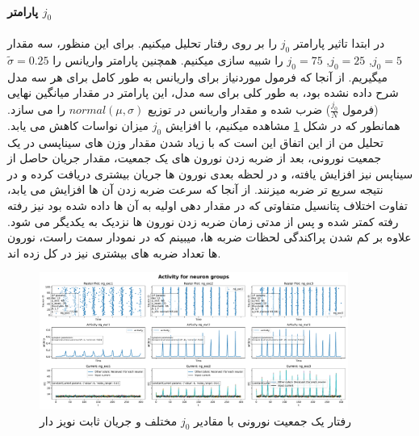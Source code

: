             \paragraph{پارامتر $j_0$}
                در ابتدا تاثیر پارامتر 
                $j_0$
                را بر روی رفتار تحلیل میکنیم. برای این منظور، سه مقدار 
                $j_0=5$,
                $j_0=25$,
                $j_0=75$
                را شبیه سازی میکنیم. همچنین پارامتر واریانس را 
                $\tilde{\sigma}=0.25$ 
                میگیریم. از آنجا که فرمول موردنیاز برای واریانس به طور کامل برای هر سه مدل شرح داده نشده بود، به طور کلی برای سه مدل، این پارامتر در مقدار میانگین نهایی
                (فرمول $\frac{j_0}{N}$) 
                ضرب شده و مقدار واریانس در توزیع 
                $normal(\mu,\sigma)$ 
                را می سازد.
                همانطور که در شکل 
                \ref{fig:part2-one-ng-full-synapse-diff-j}
                مشاهده میکنیم، با افزایش 
                $j_0$ 
                میزان نواسات کاهش می یابد. تحلیل من از این اتفاق این است که با زیاد شدن مقدار وزن های سیناپسی در یک جمعیت نورونی، بعد از ضربه زدن نورون های یک جمعیت، مقدار جریان حاصل از سیناپس نیز افزایش یافته، و در لحظه بعدی نورون ها جریان بیشتری دریافت کرده و در نتیجه سریع تر ضربه میزنند. از آنجا که سرعت ضربه زدن آن ها افزایش می یابد، تفاوت اختلاف پتانسیل متفاوتی که در مقدار دهی اولیه به آن ها داده شده بود نیز رفته رفته کمتر شده و پس از مدتی زمان ضربه زدن نورون ها نزدیک به یکدیگر می شود. علاوه بر کم شدن پراکندگی لحظات ضربه ها، میبینم که در نمودار سمت راست، نورون ها تعداد ضربه های بیشتری نیز در کل زده اند.
                \begin{figure}[!ht]
                    \centering
                    \includegraphics[width=0.9\textwidth]{plots/part2-one-ng-full-synapse-diff-j.pdf} 
                    \caption{رفتار یک جمعیت نورونی با مقادیر $j_0$ مختلف و جریان ثابت نویز دار}
                    \label{fig:part2-one-ng-full-synapse-diff-j}
                \end{figure}


